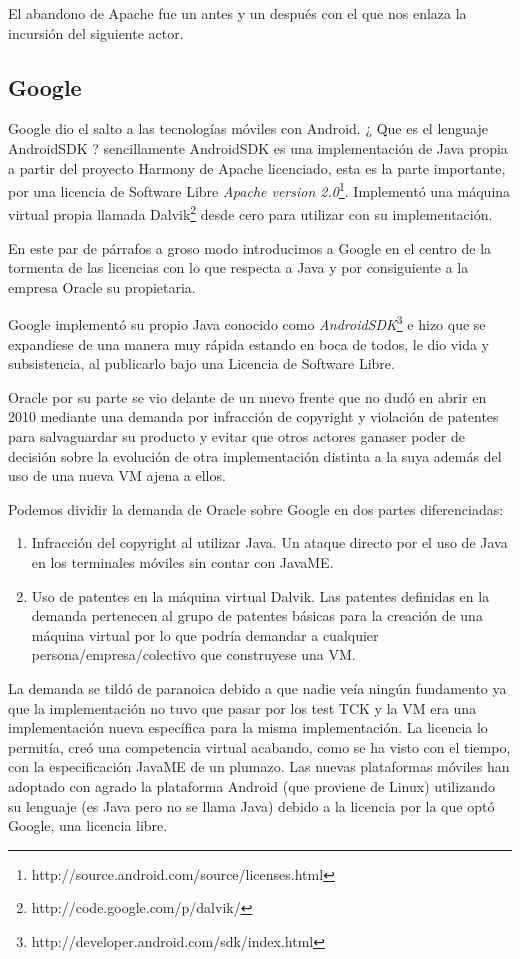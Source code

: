 \documentclass[11pt]{scrartcl}
\begin{document}
El abandono de Apache fue un antes y un después con el que nos enlaza la incursión del siguiente actor.

\subsection{Google}

Google dio el salto a las tecnologías móviles con Android. ¿ Que es el lenguaje AndroidSDK ? sencillamente AndroidSDK es una implementación de Java propia a partir del proyecto Harmony de Apache licenciado, esta es la parte importante, por una licencia de Software Libre \emph{Apache version 2.0}\footnote{http://source.android.com/source/licenses.html}. Implementó una máquina virtual propia llamada Dalvik\footnote{http://code.google.com/p/dalvik/} desde cero para utilizar con su implementación.

En este par de párrafos a groso modo introducimos a Google en el centro de la tormenta de las licencias con lo que respecta a Java y por consiguiente a la empresa Oracle su propietaria.

Google implementó su propio Java conocido como \emph{AndroidSDK}\footnote{http://developer.android.com/sdk/index.html} e hizo que se expandiese de una manera muy rápida estando en boca de todos, le dio vida y subsistencia, al publicarlo bajo una Licencia de Software Libre.

Oracle por su parte se vio delante de un nuevo frente que no dudó en abrir en 2010 mediante una demanda por infracción de copyright y violación de patentes para salvaguardar su producto y evitar que otros actores ganaser poder de decisión sobre la evolución de otra implementación distinta a la suya además del uso de una nueva VM ajena a ellos.

Podemos dividir la demanda de Oracle sobre Google en dos partes diferenciadas:
\begin{enumerate}
    \item Infracción del copyright al utilizar Java. Un ataque directo por el uso de Java en los terminales móviles sin contar con JavaME.
    \item Uso de patentes en la máquina virtual Dalvik. Las patentes definidas en la demanda pertenecen al grupo de patentes básicas para la creación de una máquina virtual por lo que podría demandar a cualquier persona/empresa/colectivo que construyese una VM.
\end{enumerate}

La demanda se tildó de paranoica debido a que nadie veía ningún fundamento ya que la implementación no tuvo que pasar por los test TCK y la VM era una implementación nueva específica para la misma implementación. La licencia lo permitía, creó una competencia virtual acabando, como se ha visto con el tiempo, con la especificación JavaME de un plumazo. Las nuevas plataformas móviles han adoptado con agrado la plataforma Android (que proviene de Linux) utilizando su lenguaje (es Java pero no se llama Java) debido a la licencia por la que optó Google, una licencia libre.
\end{document}
